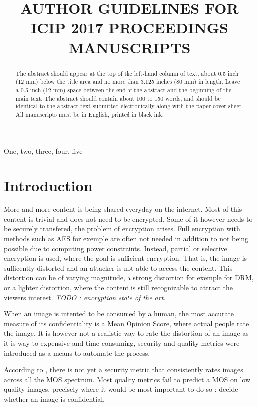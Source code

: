 \documentclass{article}
\title{AUTHOR GUIDELINES FOR ICIP 2017 PROCEEDINGS MANUSCRIPTS}
\begin{document}
%
\maketitle
%
\begin{abstract}
The abstract should appear at the top of the left-hand column of text, about
0.5 inch (12 mm) below the title area and no more than 3.125 inches (80 mm) in
length.  Leave a 0.5 inch (12 mm) space between the end of the abstract and the
beginning of the main text.  The abstract should contain about 100 to 150
words, and should be identical to the abstract text submitted electronically
along with the paper cover sheet.  All manuscripts must be in English, printed
in black ink.
\end{abstract}
%
\begin{keywords}
One, two, three, four, five
\end{keywords}
%
\section{Introduction}
\label{sec:intro}
More and more content is being shared everyday on the internet. Most of this content is trivial and does not need to be encrypted. Some of it however needs to be securely transfered, the problem of encryption arises. Full encryption with methods such as AES for exemple are often not needed in addition to not being possible due to computing power constraints. Instead, partial or selective encryption is used, where the goal is sufficient encryption. That is, the image is sufficently distorted and an attacker is not able to access the content. This distortion can be of varying magnitude, a strong distortion for exemple for DRM, or a lighter distortion, where the content is still recognizable to attract the viewers interest. \textit{TODO : encryption state of the art}.

  When an image is intented to be consumed by a human, the most accurate measure of its confidentiality is a Mean Opinion Score, where actual people rate the image. It is however not a realistic way to rate the distortion of an image as it is way to expensive and time consuming, security and quality metrics were introduced as a means to automate the process.

According to \cite{metrics_deficits}, there is not yet a security metric that consistently rates images across all the MOS spectrum. Most quality metrics fail to predict a MOS on low quality images, precisely where it would be most important to do so : decide whether an image is confidential.
\end{document}

